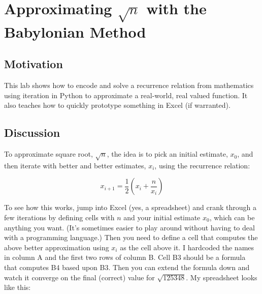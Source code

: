 \chapter{Approximating $\sqrt{n}$ with the Babylonian Method}

\setcounter{problem}{1}
\section{Motivation}

\begin{fullwidth}

This lab shows how to encode and solve a recurrence relation from mathematics using iteration in Python to approximate a real-world, real valued function.  It also teaches how to quickly prototype something in Excel (if warranted).
 
\section{Discussion}

To approximate square root, $\sqrt{n}$, the idea is to pick an initial estimate, $x_0$, and then iterate with better and better estimates, $x_{i}$, using the recurrence relation:

\[
x_{i+1} = \frac{1}{2} (x_i + \frac{n}{x_i})
\]

To see how this works, jump into Excel (yes, a spreadsheet) and crank through a few iterations by defining cells with $n$ and your initial estimate $x_0$, which can be anything you want. (It's sometimes easier to play around without having to deal with a programming language.) Then you need to define a cell that computes the above better approximation using $x_i$ as the cell above it. I hardcoded the names in column A and the first two rows of column B. Cell B3 should be a formula that computes B4 based upon B3. Then you can extend the formula down and watch it converge on the final (correct) value for $\sqrt{125348}$. My spreadsheet looks like this:


\end{fullwidth}
